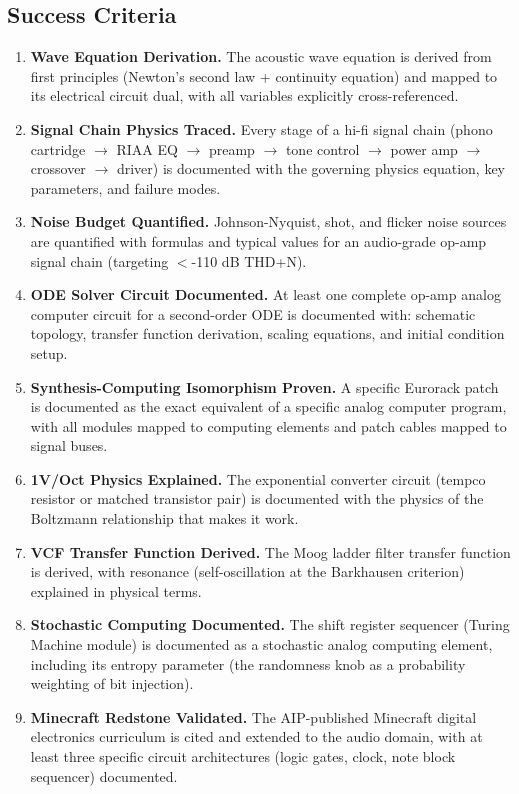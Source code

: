 \documentclass[11pt,letterpaper]{article}
\begin{document}
\subsection{Success Criteria}

\begin{enumerate}[leftmargin=2em]
  \item \textbf{Wave Equation Derivation.} The acoustic wave equation is derived from first principles (Newton's second law + continuity equation) and mapped to its electrical circuit dual, with all variables explicitly cross-referenced.
  \item \textbf{Signal Chain Physics Traced.} Every stage of a hi-fi signal chain (phono cartridge $\to$ RIAA EQ $\to$ preamp $\to$ tone control $\to$ power amp $\to$ crossover $\to$ driver) is documented with the governing physics equation, key parameters, and failure modes.
  \item \textbf{Noise Budget Quantified.} Johnson-Nyquist, shot, and flicker noise sources are quantified with formulas and typical values for an audio-grade op-amp signal chain (targeting $<$-110 dB THD+N).
  \item \textbf{ODE Solver Circuit Documented.} At least one complete op-amp analog computer circuit for a second-order ODE is documented with: schematic topology, transfer function derivation, scaling equations, and initial condition setup.
  \item \textbf{Synthesis-Computing Isomorphism Proven.} A specific Eurorack patch is documented as the exact equivalent of a specific analog computer program, with all modules mapped to computing elements and patch cables mapped to signal buses.
  \item \textbf{1V/Oct Physics Explained.} The exponential converter circuit (tempco resistor or matched transistor pair) is documented with the physics of the Boltzmann relationship that makes it work.
  \item \textbf{VCF Transfer Function Derived.} The Moog ladder filter transfer function is derived, with resonance (self-oscillation at the Barkhausen criterion) explained in physical terms.
  \item \textbf{Stochastic Computing Documented.} The shift register sequencer (Turing Machine module) is documented as a stochastic analog computing element, including its entropy parameter (the randomness knob as a probability weighting of bit injection).
  \item \textbf{Minecraft Redstone Validated.} The AIP-published Minecraft digital electronics curriculum is cited and extended to the audio domain, with at least three specific circuit architectures (logic gates, clock, note block sequencer) documented.

\end{enumerate}
\end{document}

